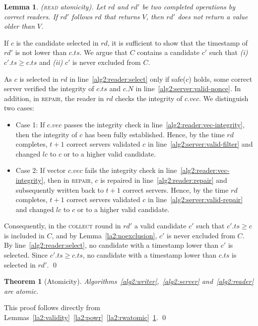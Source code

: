 \documentclass[10pt,conference,compsocconf]{IEEEtran}
\newtheorem{la}[defn]{Lemma}
\newtheorem{theo}[defn]{Theorem}
\newenvironment{prooff}{\vspace{1ex}\noindent{\bf Proof:}\hspace{0.5em}}
	{\hfill\qed\vspace{1em}}
\begin{document}
\begin{la}
\label{la2:rratomic}
\emph{(\textsc{read} atomicity).}
Let $rd$ and $rd'$ be two completed  operations by correct readers. If $rd'$ follows $rd$ that returns $V$, then $rd'$ does not return a value older than $V$.
\end{la}
\begin{prooff} If $c$ is the candidate selected in $rd$, it is sufficient to show that the timestamp of $rd'$ is not lower than $c.ts$. We argue that
$C$ contains a candidate $c'$ such that \textit{(i)} $c'.ts \geq c.ts$ and \textit{(ii)} $c'$ is never excluded from $C$.

As $c$ is selected in $rd$ in line~\ref{alg2:reader:select} only if \textsf{safe}($c$) holds, some correct server verified the integrity of $c.ts$ and $c.N$ in line~\ref{alg2:server:valid-nonce}. In addition, in \textsc{repair}, the reader in $rd$ checks the integrity of $c.vec$. We distinguish two cases:
\begin{itemize}
\item Case 1: If $c.vec$ passes the integrity check in line~\ref{alg2:reader:vec-integrity}, then the integrity of $c$ has been fully established. Hence, by the time $rd$ completes, $t+1$ correct servers validated $c$ in line~\ref{alg2:server:valid-filter} and changed $lc$ to $c$ or to a higher valid candidate.
\item Case 2: If vector $c.vec$ fails the integrity check in line~\ref{alg2:reader:vec-integrity}, then in \textsc{repair}, $c$ is repaired in line~\ref{alg2:reader:repair} and subsequently written back to $t+1$ correct servers. Hence, by the time $rd$ completes, $t+1$ correct servers validated $c$ in line~\ref{alg2:server:valid-repair} and changed $lc$ to $c$ or to a higher valid candidate.
\end{itemize}
Consequently, in the \textsc{collect} round in $rd'$ a valid candidate $c'$ such that $c'.ts \geq c$ is included in $C$, and by Lemma~\ref{la2:noexclusion}, $c'$ is never excluded from $C$. By line~\ref{alg2:reader:select}, no candidate with a timestamp lower than $c'$ is selected. Since $c'.ts \geq c.ts$, no candidate with a timestamp lower than $c.ts$ is selected in $rd'$.
\end{prooff}

\begin{theo}[Atomicity]
Algorithms~\ref{alg2:writer},~\ref{alg2:server} and~\ref{alg2:reader} are atomic.
\end{theo}
\begin{prooff} This proof follows directly from Lemmas~\ref{la2:validity}~\ref{la2:powr}~\ref{la2:rwatomic}~\ref{la2:rratomic}.
\end{prooff}
\end{document}
